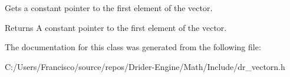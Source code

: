 Gets a constant pointer to the first element of the vector.

\begin{DoxyReturn}{Returns}
A constant pointer to the first element of the vector. 
\end{DoxyReturn}


The documentation for this class was generated from the following file\+:\begin{DoxyCompactItemize}
\item 
C\+:/\+Users/\+Francisco/source/repos/\+Drider-\/\+Engine/\+Math/\+Include/dr\+\_\+vectorn.\+h\end{DoxyCompactItemize}
